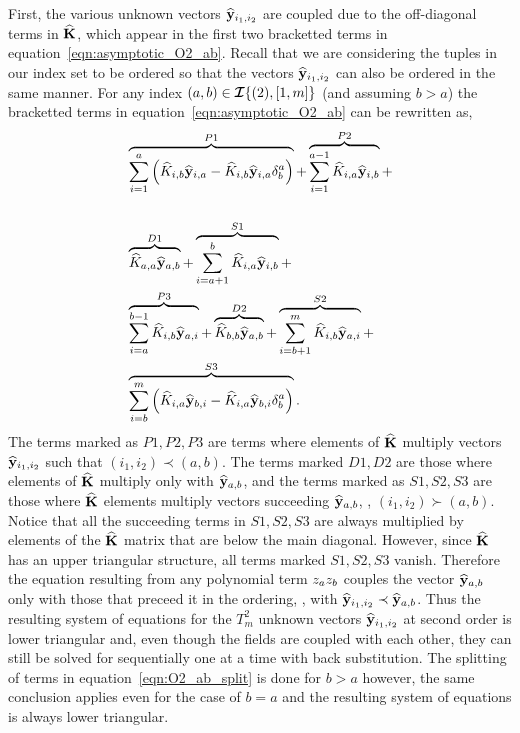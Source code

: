 First, the various unknown vectors $\widehat{\mathbf{y}}_{i_{1},i_{2}}$ are coupled due to the off-diagonal terms in $\mathbf{\widehat{K}}$, which appear in the first two bracketted terms in equation~\eqref{eqn:asymptotic_O2_ab}. Recall that we are considering the tuples in our index set to be ordered so that the vectors $\widehat{\mathbf{y}}_{i_{1},i_{2}}$ can also be ordered in the same manner. For any index $(a,b)\in\bm{\mathcal{I}}\{(2),[1,m]\}$ (and assuming $b>a$) the bracketted terms in equation~\eqref{eqn:asymptotic_O2_ab} can be rewritten as,
\begin{equation}
	\label{eqn:O2_ab_split}
	\begin{split}
		& \overbrace{\sum^{a}_{i=1}\left(\widehat{K}_{i,b}\widehat{\mathbf{y}}_{i,a} - \widehat{K}_{i,b}\widehat{\mathbf{y}}_{i,a}\delta^{a}_{b}\right)}^{P1} +
		\overbrace{\sum^{a-1}_{i=1}\widehat{K}_{i,a}\widehat{\mathbf{y}}_{i,b}}^{P2} + \\
		  \\
		& \overbrace{\widehat{K}_{a,a}\widehat{\mathbf{y}}_{a,b}}^{D1} + \overbrace{\sum^{b}_{i=a+1}\widehat{K}_{i,a}\widehat{\mathbf{y}}_{i,b}}^{S1} + \\
		& \overbrace{\sum^{b-1}_{i=a}\widehat{K}_{i,b}\widehat{\mathbf{y}}_{a,i}}^{P3} +
		\overbrace{\widehat{K}_{b,b}\widehat{\mathbf{y}}_{a,b}}^{D2} +
		\overbrace{\sum^{m}_{i=b+1}\widehat{K}_{i,b}\widehat{\mathbf{y}}_{a,i}}^{S2} + \\
		& \overbrace{\sum^{m}_{i=b}\left(\widehat{K}_{i,a}\widehat{\mathbf{y}}_{b,i}  - 
		\widehat{K}_{i,a}\widehat{\mathbf{y}}_{b,i}\delta^{a}_{b}\right)}^{S3}.
	\end{split}
\end{equation}
The terms marked as $P1,P2,P3$ are terms where elements of $\mathbf{\widehat{K}}$ multiply vectors $\widehat{\mathbf{y}}_{i_{1},i_{2}}$ such that $(i_{1},i_{2})\prec(a,b)$. The terms marked $D1,D2$ are those where elements of $\mathbf{\widehat{K}}$ multiply only with $\widehat{\mathbf{y}}_{a,b}$, and the terms marked as $S1,S2,S3$ are those where $\mathbf{\widehat{K}}$ elements multiply vectors succeeding $\widehat{\mathbf{y}}_{a,b}$, \ie, $(i_{1},i_{2})\succ(a,b)$. Notice that all the succeeding terms in $S1,S2,S3$ are always multiplied by elements of the $\mathbf{\widehat{K}}$ matrix that are below the main diagonal. However, since $\mathbf{\widehat{K}}$ has an upper triangular structure, all terms marked $S1,S2,S3$ vanish. Therefore the equation resulting from any polynomial term $z_{a}z_{b}$ couples the vector $\widehat{\mathbf{y}}_{a,b}$ only with those that preceed it in the ordering, \ie, with $\widehat{\mathbf{y}}_{i_{1},i_{2}}\prec\widehat{\mathbf{y}}_{a,b}$. Thus the resulting system of equations for the $T^{2}_{m}$ unknown vectors $\widehat{\mathbf{y}}_{i_{1},i_{2}}$ at second order is lower triangular and, even though the fields are coupled with each other, they can still be solved for sequentially one at a time with back substitution. The splitting of terms in equation~\eqref{eqn:O2_ab_split} is done for $b>a$ however, the same conclusion applies even for the case of $b=a$ and the resulting system of equations is always lower triangular. 

